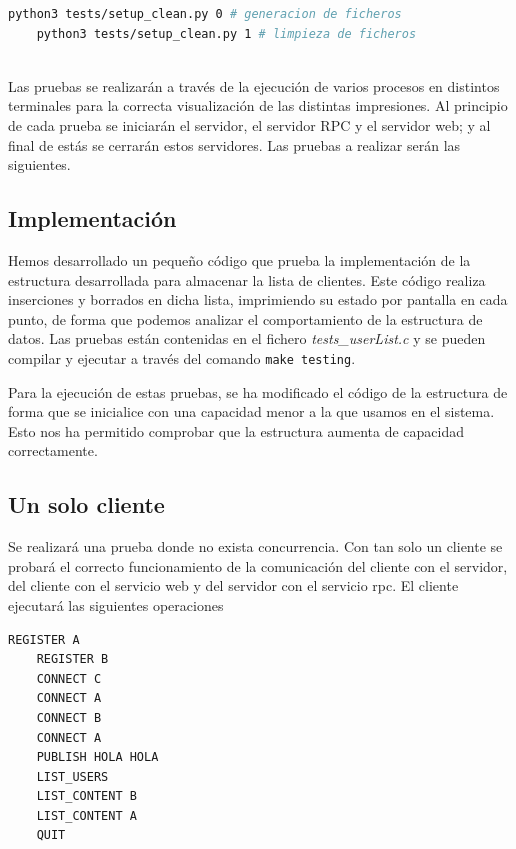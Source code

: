 \documentclass[]{article}
\begin{document}
\begin{lstlisting}[caption=Generar/limpiar ficheros de prueba y entradas de terminal, language=bash]
    python3 tests/setup_clean.py 0 # generacion de ficheros
    python3 tests/setup_clean.py 1 # limpieza de ficheros
    
\end{lstlisting}

Las pruebas se realizarán a través de la ejecución de varios procesos en distintos terminales para la correcta visualización de las distintas impresiones. Al principio de cada prueba se iniciarán el servidor, el servidor RPC y el servidor web; y al final de estás se cerrarán estos servidores.
Las pruebas a realizar serán las siguientes.
\subsection{Implementación}
\label{subsec:imp}
Hemos desarrollado un pequeño código que prueba la implementación de la estructura desarrollada para almacenar la lista de clientes. Este código realiza inserciones y borrados en dicha lista, imprimiendo su estado por pantalla en cada punto, de forma que podemos analizar el comportamiento de la estructura de datos. Las pruebas están contenidas en el fichero \textit{tests\_userList.c} y se pueden compilar y ejecutar a través del comando \texttt{make testing}. 

Para la ejecución de estas pruebas, se ha modificado el código de la estructura de forma que se inicialice con una capacidad menor a la que usamos en el sistema. Esto nos ha permitido comprobar que la estructura aumenta de capacidad correctamente.

\subsection{Un solo cliente}
\label{subsection:1_cliente}
Se realizará una prueba donde no exista concurrencia. Con tan solo un cliente se probará el correcto funcionamiento de la comunicación del cliente con el servidor, del cliente con el servicio web y del servidor con el servicio rpc.
El cliente ejecutará las siguientes operaciones
\begin{lstlisting}[caption=Operaciones a realizar por el cliente]
    REGISTER A
    REGISTER B
    CONNECT C
    CONNECT A
    CONNECT B
    CONNECT A
    PUBLISH HOLA HOLA 
    LIST_USERS
    LIST_CONTENT B
    LIST_CONTENT A
    QUIT
\end{lstlisting}
\end{document}
